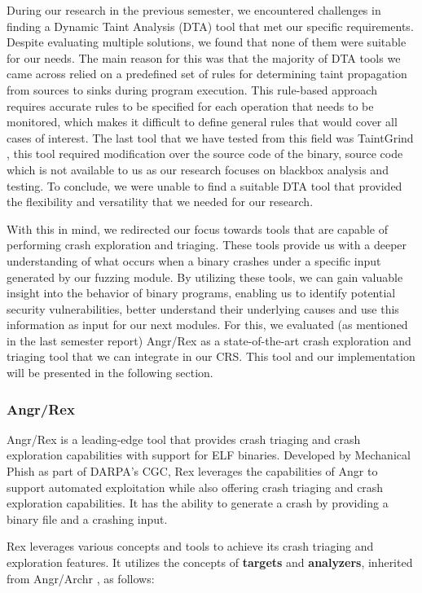 \documentclass[12pt,a4paper,english,onecolumn]{IEEEtran}
\begin{document}
During our research in the previous semester, we encountered challenges in finding a Dynamic Taint Analysis (DTA) tool that met our specific requirements. Despite evaluating multiple solutions, we found that none of them were suitable for our needs. The main reason for this was that the majority of DTA tools we came across relied on a predefined set of rules for determining taint propagation from sources to sinks during program execution. This rule-based approach requires accurate rules to be specified for each operation that needs to be monitored, which makes it difficult to define general rules that would cover all cases of interest.
The last tool that we have tested from this field was TaintGrind \cite{tainggrind}, this tool required modification over the source code of the binary, source code which is not available to us as our research focuses on blackbox analysis and testing. To conclude, we were unable to find a suitable DTA tool that provided the flexibility and versatility that we needed for our research.

With this in mind, we redirected our focus towards tools that are capable of performing crash exploration and triaging. These tools provide us with a deeper understanding of what occurs when a binary crashes under a specific input generated by our fuzzing module. By utilizing these tools, we can gain valuable insight into the behavior of binary programs, enabling us to identify potential security vulnerabilities, better understand their underlying causes and use this information as input for our next modules. For this,  we evaluated (as mentioned in the last semester report) Angr/Rex \cite{angr} as a state-of-the-art crash exploration and triaging tool that we can integrate in our CRS. This tool and our implementation will be presented in the following section.

\subsubsection{Angr/Rex}

Angr/Rex \cite{angr} is a leading-edge tool that provides crash triaging and crash exploration capabilities with support for ELF binaries. Developed by Mechanical Phish \cite{mecphish} as part of DARPA's CGC, Rex leverages the capabilities of Angr to support automated exploitation while also offering crash triaging and crash exploration capabilities. It has the ability to generate a crash by providing a binary file and a crashing input.

Rex leverages various concepts and tools to achieve its crash triaging and exploration features. It utilizes the concepts of \textbf{targets} and \textbf{analyzers}, inherited from Angr/Archr \cite{archr}, as follows:
\end{document}
